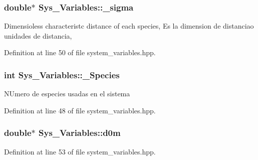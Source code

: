 \subsubsection[{\texorpdfstring{\+\_\+sigma}{_sigma}}]{\setlength{\rightskip}{0pt plus 5cm}double$\ast$ Sys\+\_\+\+Variables\+::\+\_\+sigma\hspace{0.3cm}{\ttfamily [protected]}}\hypertarget{class_sys___variables_a45c7ed237b66678ae220aa528d7fe0e4}{}\label{class_sys___variables_a45c7ed237b66678ae220aa528d7fe0e4}
Dimensioless characteristc distance of each species, Es la dimension de distanciao unidades de distancia, 

Definition at line 50 of file system\+\_\+variables.\+hpp.

\subsubsection[{\texorpdfstring{\+\_\+\+Species}{_Species}}]{\setlength{\rightskip}{0pt plus 5cm}int Sys\+\_\+\+Variables\+::\+\_\+\+Species\hspace{0.3cm}{\ttfamily [protected]}}\hypertarget{class_sys___variables_a37a45bd197ccf2b68889bbe980fed868}{}\label{class_sys___variables_a37a45bd197ccf2b68889bbe980fed868}
N\+Umero de especies usadas en el sistema 

Definition at line 48 of file system\+\_\+variables.\+hpp.

\subsubsection[{\texorpdfstring{d0m}{d0m}}]{\setlength{\rightskip}{0pt plus 5cm}double$\ast$ Sys\+\_\+\+Variables\+::d0m\hspace{0.3cm}{\ttfamily [protected]}}\hypertarget{class_sys___variables_a340b1387aee2e38fe39223c33f1d8507}{}\label{class_sys___variables_a340b1387aee2e38fe39223c33f1d8507}


Definition at line 53 of file system\+\_\+variables.\+hpp.

